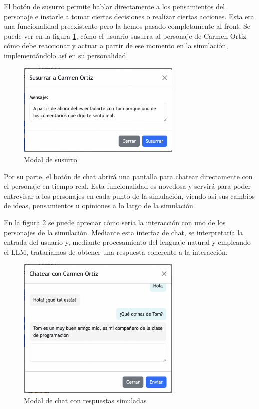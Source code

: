 El botón de susurro permite hablar directamente a los pensamientos del personaje e instarle a tomar ciertas decisiones o realizar ciertas acciones. Esta era una funcionalidad preexistente pero la hemos pasado completamente al front. Se puede ver en la figura \ref{fig:cuadroSusurro}, cómo el usuario susurra al personaje de Carmen Ortiz cómo debe reaccionar y actuar a partir de ese momento en la simulación, implementándolo así en su personalidad.

\begin{figure}[H]
	\centering
	\includegraphics[width = 0.7\textwidth]{Imagenes/Vectorial/cuadroSusurro.png}
	\caption{Modal de susurro}
	\label{fig:cuadroSusurro}
\end{figure}

Por su parte, el botón de chat abrirá una pantalla para chatear directamente con el personaje en tiempo real. Esta funcionalidad es novedosa y servirá para poder entrevisar a los personajes en cada punto de la simulación, viendo así sus cambios de ideas, pensamientos u opiniones a lo largo de la simulación.

En la figura \ref{fig:cuadroChat} se puede apreciar cómo sería la interacción con uno de los personajes de la simulación. Mediante esta interfaz de chat, se interpretaría la entrada del usuario y, mediante procesamiento del lenguaje natural y empleando el LLM, trataríamos de obtener una respuesta coherente a la interacción.

\begin{figure}[H]
	\centering
	\includegraphics[width = 0.7\textwidth]{Imagenes/Vectorial/cuadroChat.png}
	\caption{Modal de chat con respuestas simuladas}
	\label{fig:cuadroChat}
\end{figure}



